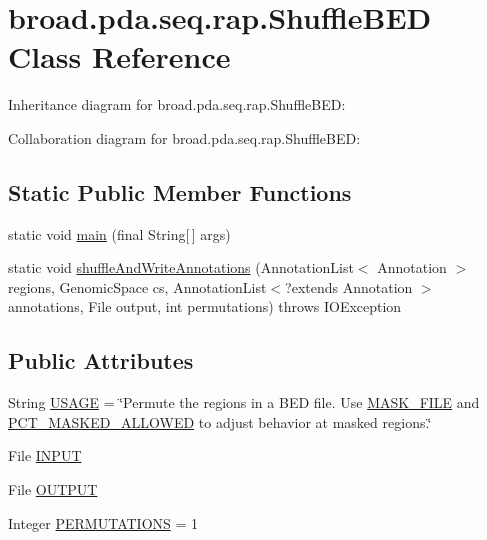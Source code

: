 \hypertarget{classbroad_1_1pda_1_1seq_1_1rap_1_1_shuffle_b_e_d}{\section{broad.\+pda.\+seq.\+rap.\+Shuffle\+B\+E\+D Class Reference}
\label{classbroad_1_1pda_1_1seq_1_1rap_1_1_shuffle_b_e_d}
}


Inheritance diagram for broad.\+pda.\+seq.\+rap.\+Shuffle\+B\+E\+D\+:


Collaboration diagram for broad.\+pda.\+seq.\+rap.\+Shuffle\+B\+E\+D\+:
\subsection*{Static Public Member Functions}
\begin{DoxyCompactItemize}
\item 
static void \hyperlink{classbroad_1_1pda_1_1seq_1_1rap_1_1_shuffle_b_e_d_a989b6ad78711c6085c9f7f8cdaf2204c}{main} (final String\mbox{[}$\,$\mbox{]} args)
\item 
static void \hyperlink{classbroad_1_1pda_1_1seq_1_1rap_1_1_shuffle_b_e_d_ab57d670efa1ad1a6aaba06ea3e1316de}{shuffle\+And\+Write\+Annotations} (Annotation\+List$<$ Annotation $>$ regions, Genomic\+Space cs, Annotation\+List$<$?extends Annotation $>$ annotations, File output, int permutations)  throws I\+O\+Exception 
\end{DoxyCompactItemize}
\subsection*{Public Attributes}
\begin{DoxyCompactItemize}
\item 
String \hyperlink{classbroad_1_1pda_1_1seq_1_1rap_1_1_shuffle_b_e_d_a4cd614ee2fc3feb74d8a3edbea8bb987}{U\+S\+A\+G\+E} = \char`\"{}Permute the regions in a B\+E\+D file. Use \hyperlink{classbroad_1_1pda_1_1seq_1_1rap_1_1_genome_command_line_program_a95101755950aa34b2ce5556ce6711c6d}{M\+A\+S\+K\+\_\+\+F\+I\+L\+E} and \hyperlink{classbroad_1_1pda_1_1seq_1_1rap_1_1_genome_command_line_program_acf7c9aca8c01c21ebdbee5a628add301}{P\+C\+T\+\_\+\+M\+A\+S\+K\+E\+D\+\_\+\+A\+L\+L\+O\+W\+E\+D} to adjust behavior at masked regions.\char`\"{}
\item 
File \hyperlink{classbroad_1_1pda_1_1seq_1_1rap_1_1_shuffle_b_e_d_aeec4441997b1b359679c19422be370c0}{I\+N\+P\+U\+T}
\item 
File \hyperlink{classbroad_1_1pda_1_1seq_1_1rap_1_1_shuffle_b_e_d_a3c0c1d11d2cb628b0c240193bf0a4eae}{O\+U\+T\+P\+U\+T}
\item 
Integer \hyperlink{classbroad_1_1pda_1_1seq_1_1rap_1_1_shuffle_b_e_d_a14cd1ab57450c8538113ee116a8601cb}{P\+E\+R\+M\+U\+T\+A\+T\+I\+O\+N\+S} = 1
\end{DoxyCompactItemize}
